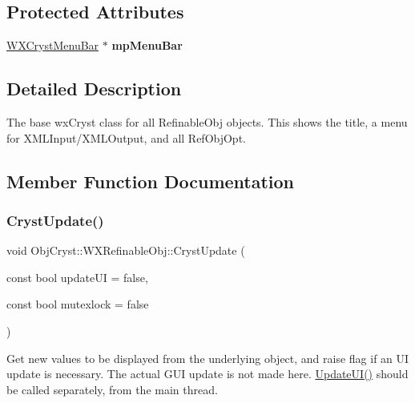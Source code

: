 \subsection*{Protected Attributes}
\begin{DoxyCompactItemize}
\item 
\mbox{\label{class_obj_cryst_1_1_w_x_refinable_obj_a1a53ab3646070ff4bc799321c22c0cd3}} 
\mbox{\hyperlink{class_obj_cryst_1_1_w_x_cryst_menu_bar}{W\+X\+Cryst\+Menu\+Bar}} $\ast$ {\bfseries mp\+Menu\+Bar}
\end{DoxyCompactItemize}


\subsection{Detailed Description}
The base wx\+Cryst class for all Refinable\+Obj objects. This shows the title, a menu for X\+M\+L\+Input/\+X\+M\+L\+Output, and all Ref\+Obj\+Opt. 

\subsection{Member Function Documentation}
\mbox{\label{class_obj_cryst_1_1_w_x_refinable_obj_a8249d288e62ad1ebffeea91f77ae37a3}} 
\subsubsection{\texorpdfstring{CrystUpdate()}{CrystUpdate()}}
{\footnotesize\ttfamily void Obj\+Cryst\+::\+W\+X\+Refinable\+Obj\+::\+Cryst\+Update (\begin{DoxyParamCaption}\item[{const bool}]{update\+UI = {\ttfamily false},  }\item[{const bool}]{mutexlock = {\ttfamily false} }\end{DoxyParamCaption})\hspace{0.3cm}{\ttfamily [virtual]}}

Get new values to be displayed from the underlying object, and raise flag if an UI update is necessary. The actual G\+UI update is not made here. \mbox{\hyperlink{class_obj_cryst_1_1_w_x_refinable_obj_acbf70975a79661a73a1ae3c39c9c3045}{Update\+U\+I()}} should be called separately, from the main thread.


